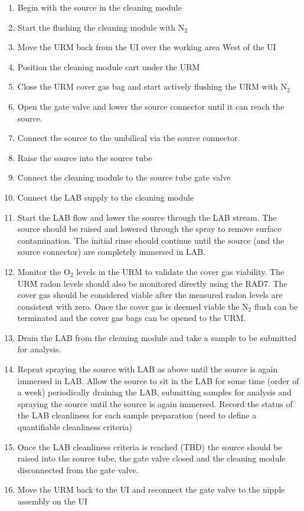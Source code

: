 \begin{}


\begin{enumerate}
\item Begin with the source in the cleaning module
\item Start the flushing the cleaning module with N$_{2}$ 
\item Move the URM back from the UI over the working area West of the UI
\item Position the cleaning module cart under the URM
\item Close the URM cover gas bag and start actively flushing the URM with N$_{2}$
\item Open the gate valve and lower the source connector until it can reach the source.
\item Connect the source to the umbilical via the source connector. 
\item Raise the source into the source tube
\item Connect the cleaning module to the source tube gate valve
\item Connect the LAB supply to the cleaning module
\item Start the LAB flow and lower the source through the LAB stream. The source should be  raised and lowered through the spray to remove surface contamination. The initial rinse should continue until the source (and the source connector) are completely immersed in LAB.
\item Monitor the O$_2$ levels in the URM to validate the cover gas viability. The URM radon levels should also be monitored directly using the RAD7. The cover gas should be considered viable after the measured radon levels are consistent with zero. Once the cover gas is deemed viable the N$_{2}$ flush can be terminated and the cover gas bags can be opened to the URM. 
\item Drain the LAB from the cleaning module and take a sample to be submitted for analysis.
\item Repeat spraying the source with LAB as above until the source is again immersed in LAB. Allow the source to sit in the LAB for some time (order of a week) periodically draining the LAB, submitting samples for analysis and spraying the source until the source is again immersed. Record the status of the LAB cleanliness for each sample preparation (need to define a quantifiable cleanliness criteria)
\item Once the LAB cleanliness criteria is reached (TBD) the source should be raised into the source tube, the gate valve closed and the cleaning module disconnected from the gate valve. 
\item Move the URM back to the UI and reconnect the gate valve to the nipple assembly on the UI
\end{enumerate}

\end{}
